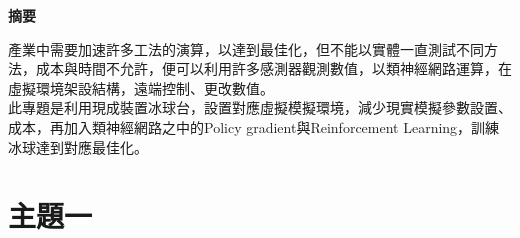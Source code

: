 \documentclass[14pt,a4paper]{article}
\begin{document}
\begin{center}

\LARGE\textbf{摘要}\\
\begin{Large}
\begin{flushleft}
\hspace{12pt} 產業中需要加速許多工法的演算，以達到最佳化，但不能以實體一直測試不同方法，成本與時間不允許，便可以利用許多感測器觀測數值，以類神經網路運算，在虛擬環境架設結構，遠端控制、更改數值。\\
 \hspace{12pt} 此專題是利用現成裝置冰球台，設置對應虛擬模擬環境，減少現實模擬參數設置、成本，再加入類神經網路之中的Policy gradient與Reinforcement Learning，訓練冰球達到對應最佳化。
\end{flushleft}
\end{Large}
\newpage
\renewcommand{\contentsname}{\centerline{\fontsize{18pt}{\baselineskip}\selectfont\textbf{目\quad 錄}}}
\tableofcontents
\newpage
\renewcommand{\listfigurename}{\centerline{\fontsize{18pt}{\baselineskip}\selectfont\textbf{圖\quad 表\quad 目\quad 錄 }}}
\listoffigures
\newpage
\end{center}
\newpage
\section{主題一}
\setcounter{page}{1}
\end{document}
